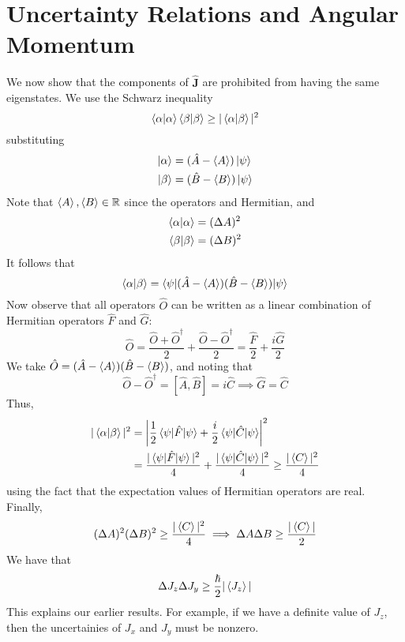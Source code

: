 \documentclass{report}
\begin{document}
\section{Uncertainty Relations and Angular Momentum}
We now show that the components of \(\hat{\mathbf{J}}\) are prohibited from having the same eigenstates. We use the Schwarz inequality
\[
\braket{\alpha | \alpha}\braket{\beta | \beta} \geq | \braket{\alpha | \beta}|^2
\] 
substituting
\begin{align*}
	\ket \alpha &= (\hat A - \braket{A}) \ket{\psi}\\
	\ket \beta &= (\hat B - \braket{B}) \ket \psi
\end{align*}
Note that \(\braket A, \braket B \in \mathbb R\) since the operators and Hermitian, and 
\begin{align*}
	\braket{\alpha | \alpha} &= (\Delta A)^2 \\
	\braket{\beta | \beta} &= (\Delta B)^2
\end{align*}
It follows that 
\[
\braket{\alpha | \beta} = \braket{\psi | (\hat A - \braket A ) ( \hat B - \braket B) | \psi}
\]
Now observe that all operators \(\hat O\) can be written as a linear combination of Hermitian operators \(\hat F\) and \(\hat G\):
\[
\hat O = \frac{\hat O + \hat O ^\dag}{2} + \frac{\hat O - \hat O ^\dag}{2} = \frac{\hat F}{2} + \frac{i \hat G}{2}
\] 
We take \(\hat O = (\hat A - \braket A )(\hat B - \braket B)\), and noting that
\[
	\hat O - \hat O ^\dag = [\hat A , \hat B] = i \hat C \implies \hat G = \hat C
\] 
Thus, 
\begin{align*}
	|\braket{\alpha | \beta}| ^2 &= \left| \frac{1}{2} \braket{\psi | \hat F | \psi} + \frac{i}{2}\braket{\psi | \hat C | \psi}\right|^2 \\
				     &= \frac{|\braket{\psi | \hat F | \psi}| ^2}{4} + \frac{| \braket{\psi | \hat C | \psi}| ^2}{4} \geq \frac{|\braket{C}|^2}{4}
\end{align*}
using the fact that the expectation values of Hermitian operators are real. Finally, 
\[
	(\Delta A)^2 (\Delta B)^2 \geq \frac{| \braket C |^2}{4} \implies \Delta A \Delta B \geq \frac{|\braket C |}{2}
\] 
We have that 
\[
\Delta J_z \Delta J_y \geq \frac{\hbar}{2} | \braket{ J_z} |
\] 
This explains our earlier results. For example, if we have a definite value of \(J_z\), then the uncertainies of \(J_x\) and \(J_y\) must be nonzero. 
\end{document}
